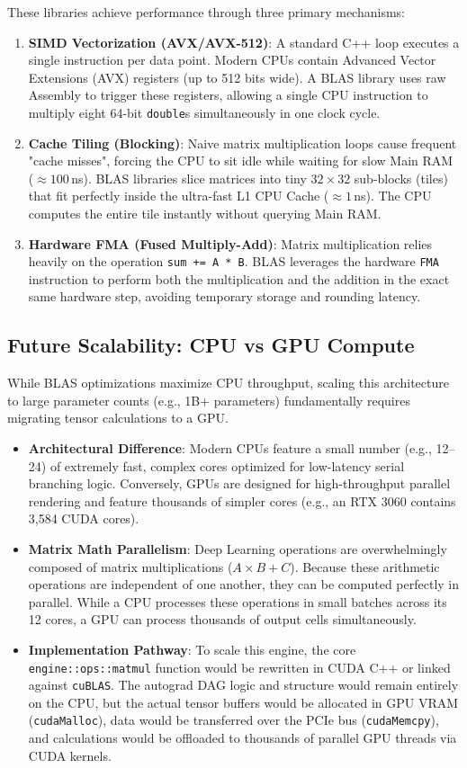 \documentclass[12pt, a4paper]{article}
\begin{document}
These libraries achieve performance through three primary mechanisms:
\begin{enumerate}
    \item \textbf{SIMD Vectorization (AVX/AVX-512)}: A standard C++ loop executes a single instruction per data point. Modern CPUs contain Advanced Vector Extensions (AVX) registers (up to 512 bits wide). A BLAS library uses raw Assembly to trigger these registers, allowing a single CPU instruction to multiply eight 64-bit \texttt{double}s simultaneously in one clock cycle.
    \item \textbf{Cache Tiling (Blocking)}: Naive matrix multiplication loops cause frequent "cache misses", forcing the CPU to sit idle while waiting for slow Main RAM ($\approx 100$\,ns). BLAS libraries slice matrices into tiny $32 \times 32$ sub-blocks (tiles) that fit perfectly inside the ultra-fast L1 CPU Cache ($\approx 1$\,ns). The CPU computes the entire tile instantly without querying Main RAM.
    \item \textbf{Hardware FMA (Fused Multiply-Add)}: Matrix multiplication relies heavily on the operation \texttt{sum += A * B}. BLAS leverages the hardware \texttt{FMA} instruction to perform both the multiplication and the addition in the exact same hardware step, avoiding temporary storage and rounding latency.
\end{enumerate}

\subsection{Future Scalability: CPU vs GPU Compute}
While BLAS optimizations maximize CPU throughput, scaling this architecture to large parameter counts (e.g., 1B+ parameters) fundamentally requires migrating tensor calculations to a GPU.

\begin{itemize}
    \item \textbf{Architectural Difference}: Modern CPUs feature a small number (e.g., 12--24) of extremely fast, complex cores optimized for low-latency serial branching logic. Conversely, GPUs are designed for high-throughput parallel rendering and feature thousands of simpler cores (e.g., an RTX 3060 contains 3,584 CUDA cores).
    \item \textbf{Matrix Math Parallelism}: Deep Learning operations are overwhelmingly composed of matrix multiplications ($A \times B + C$). Because these arithmetic operations are independent of one another, they can be computed perfectly in parallel. While a CPU processes these operations in small batches across its 12 cores, a GPU can process thousands of output cells simultaneously.
    \item \textbf{Implementation Pathway}: To scale this engine, the core \texttt{engine::ops::matmul} function would be rewritten in CUDA C++ or linked against \texttt{cuBLAS}. The autograd DAG logic and structure would remain entirely on the CPU, but the actual tensor buffers would be allocated in GPU VRAM (\texttt{cudaMalloc}), data would be transferred over the PCIe bus (\texttt{cudaMemcpy}), and calculations would be offloaded to thousands of parallel GPU threads via CUDA kernels.
\end{itemize}
\end{document}
